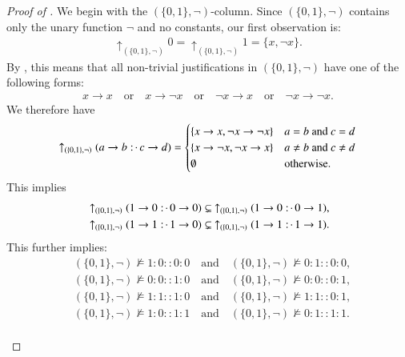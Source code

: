\documentclass[11pt]{amsart}
\theoremstyle{definition} %
\newcommand{\righttherefore}{:\joinrel\cdot\,}
\begin{document}
\begin{proof}[Proof of ] We begin with the $(\{0,1\},\neg)$-column. Since $(\{0,1\},\neg)$ contains only the unary function $\neg$ and no constants, our first observation is:
\begin{align*} 
	\uparrow_{(\{0,1\},\neg)} 0=\uparrow_{(\{0,1\},\neg)} 1=\{x,\neg x\}.
\end{align*} By , this means that all non-trivial justifications in $(\{0,1\},\neg)$ have one of the following forms:
\begin{align*} 
	x\to x \quad\text{or}\quad x\to\neg x \quad\text{or}\quad \neg x\to x \quad\text{or}\quad \neg x\to\neg x.
\end{align*} We therefore have
\begin{align*} 
	\uparrow_{(\{0,1\},\neg)}(a\to b\righttherefore c\to d)=\begin{cases}
		\{x\to x,\neg x\to\neg x\} & a=b\text{ and }c=d\\
		\{x\to\neg x,\neg x\to x\} & a\neq b\text{ and }c\neq d\\
		\emptyset & \text{otherwise}.
	\end{cases}
\end{align*} This implies
\begin{align*} 
	&\uparrow_{(\{0,1\},\neg)}(1\to 0\righttherefore 0\to 0)\subsetneq\ \uparrow_{(\{0,1\},\neg)}(1\to 0\righttherefore 0\to 1),\\
	&\uparrow_{(\{0,1\},\neg)}(1\to 1\righttherefore 1\to 0)\subsetneq\ \uparrow_{(\{0,1\},\neg)}(1\to 1\righttherefore 1\to 1).
\end{align*} This further implies:
\begin{align} 
	\label{equ:Bneg_notmodels_1000_0100} &(\{0,1\},\neg)\not\models 1:0::0:0 \quad\text{and}\quad (\{0,1\},\neg)\not\models 0:1::0:0,\\
	\label{equ:Bneg_notmodels_0010_0001} &(\{0,1\},\neg)\not\models 0:0::1:0 \quad\text{and}\quad (\{0,1\},\neg)\not\models 0:0::0:1,\\
	\label{equ:Bneg_notmodels_1110_1101} &(\{0,1\},\neg)\not\models 1:1::1:0 \quad\text{and}\quad (\{0,1\},\neg)\not\models 1:1::0:1,\\
	\label{equ:Bneg_notmodels_1011_0111} &(\{0,1\},\neg)\not\models 1:0::1:1 \quad\text{and}\quad (\{0,1\},\neg)\not\models 0:1::1:1.
\end{align}\\


\end{proof}
\end{document}
